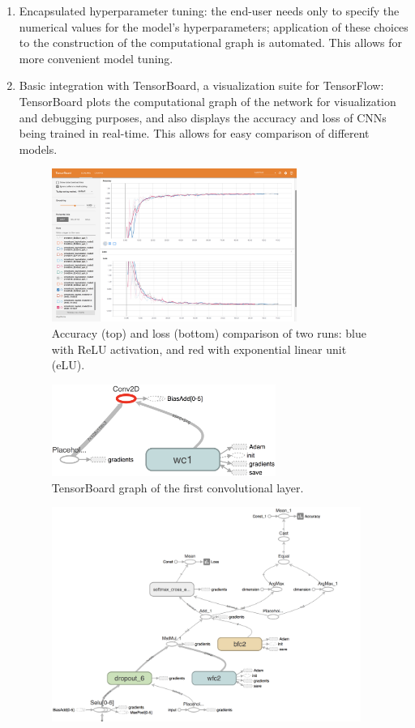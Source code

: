 \documentclass[a4paper, 11pt]{article} %
\begin{document}
		\begin{enumerate}
			\item Encapsulated hyperparameter tuning: the end-user needs 
			only to specify the numerical values for the model's 
			hyperparameters;
			application of these choices to the construction of the 
			computational 
			graph is automated. This allows for more convenient model tuning.
			\item Basic integration with TensorBoard, a visualization suite for 
			TensorFlow: TensorBoard plots the computational graph of the 
			network for visualization and debugging purposes, and also 
			displays the accuracy and loss of CNNs being trained in real-time.
			This allows for easy comparison of different models.
			\begin{figure}[H]
				\centering
				\includegraphics[height=5cm]{figures/tb_acc_loss}
				\caption{Accuracy (top) and loss (bottom) comparison of two 
				runs: blue with ReLU activation, and red with exponential 
				linear unit (eLU).}
			\end{figure}
			\begin{figure}[H]
				\centering
				\includegraphics[height=3cm]{figures/tb_graph_1}
				\caption{TensorBoard graph of the first convolutional layer.}
			\end{figure}
			\begin{figure}[H]
				\centering
				\includegraphics[height=7cm]{figures/tb_graph_2}

\end{figure}
\end{enumerate}
\end{document}
